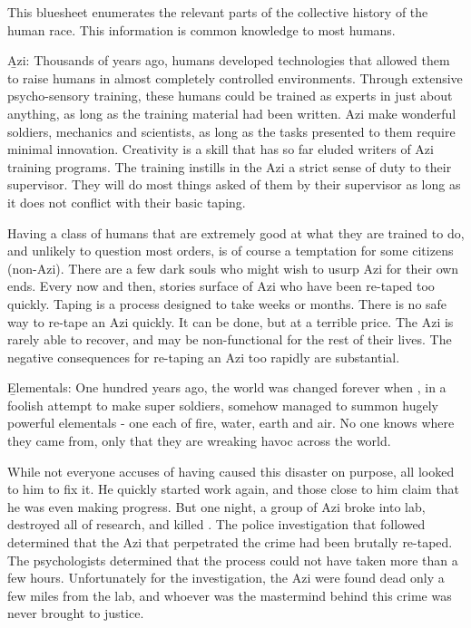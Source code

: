 \documentclass[blue]{elementals}
\begin{document}
\name{\bTest{}}

This bluesheet enumerates the relevant parts of the collective history of the human race. This information is common knowledge to most humans.

{\b{Azi:}} %
Thousands of years ago, humans developed technologies that allowed them to raise humans in almost completely controlled environments. Through extensive psycho-sensory training, these humans could be trained as experts in just about anything, as long as the training material had been written. Azi make wonderful soldiers, mechanics and scientists, as long as the tasks presented to them require minimal innovation. Creativity is a skill that has so far eluded writers of Azi training programs. The training instills in the Azi a strict sense of duty to their supervisor. They will do most things asked of them by their supervisor as long as it does not conflict with their basic taping.

Having a class of humans that are extremely good at what they are trained to do, and unlikely to question most orders, is of course a temptation for some citizens (non-Azi). There are a few dark souls who might wish to usurp Azi for their own ends. Every now and then, stories surface of Azi who have been re-taped too quickly.  Taping is a process designed to take weeks or months. There is no safe way to re-tape an Azi quickly. It can be done, but at a terrible price. The Azi is rarely able to recover, and may be non-functional for the rest of their lives.  The negative consequences for re-taping an Azi too rapidly are substantial. %

{\b{Elementals:}}
One hundred years ago, the world was changed forever when \cGrandfather{}, in a foolish attempt to make super soldiers, somehow managed to summon hugely powerful elementals - one each of fire, water, earth and air. No one knows where they came from, only that they are wreaking havoc across the world. 

While not everyone accuses \cGrandfather{} of having caused this disaster on purpose, all looked to him to fix it. He quickly started work again, and those close to him claim that he was even making progress. But one night, a group of Azi broke into \cGrandfather{\their} lab, destroyed all of \cGrandfather{\their} research, and killed \cGrandfather{\them}. The police investigation that followed determined that the Azi that perpetrated the crime had been brutally re-taped. The psychologists determined that the process could not have taken more than a few hours. Unfortunately for the investigation, the Azi were found dead only a few miles from the lab, and whoever was the mastermind behind this crime was never brought to justice.
\end{document}
